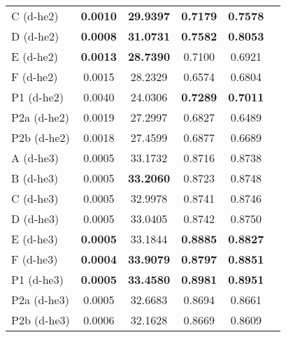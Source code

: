 \documentclass[superscriptaddress,longbibliography,aps,prl,twocolumn,10pt]{revtex4-2}
\begin{document}
\begin{table}[t]
{\begin{tabular}{lccccc}
C (d-he2) \cite{Khan2014, stain_normalisation_toolbox_v2_2, Ruifrok2001} & \textbf{0.0010} & \textbf{29.9397} & \textbf{0.7179} & \textbf{0.7578} \\
D (d-he2) \cite{Khan2014, stain_normalisation_toolbox_v2_2, Macenko2009} & \textbf{0.0008} & \textbf{31.0731} & \textbf{0.7582} & \textbf{0.8053} \\
E (d-he2) \cite{Khan2014, stain_normalisation_toolbox_v2_2} & \textbf{0.0013} & \textbf{28.7390} & 0.7100 & 0.6921 \\
F (d-he2) \cite{Alsubaie2017} & 0.0015 & 28.2329 & 0.6574 & 0.6804 \\
P1 (d-he2) & 0.0040 & 24.0306 & \textbf{0.7289} & \textbf{0.7011} \\
P2a (d-he2) & 0.0019 & 27.2997 & 0.6827 & 0.6489 \\
P2b (d-he2) & 0.0018 & 27.4599 & 0.6877 & 0.6689 \\
\hline
A (d-he3) \cite{Ruifrok2001} & 0.0005 & 33.1732 & 0.8716 & 0.8738 \\
B (d-he3) \cite{Ruifrok2001} & 0.0005 & \textbf{33.2060} & 0.8723 & 0.8748 \\
C (d-he3) \cite{Khan2014, stain_normalisation_toolbox_v2_2, Ruifrok2001} & 0.0005 & 32.9978 & 0.8741 & 0.8746 \\
D (d-he3) \cite{Khan2014, stain_normalisation_toolbox_v2_2, Macenko2009} & 0.0005 & 33.0405 & 0.8742 & 0.8750 \\
E (d-he3) \cite{Khan2014, stain_normalisation_toolbox_v2_2} & \textbf{0.0005} & 33.1844 & \textbf{0.8885} & \textbf{0.8827} \\
F (d-he3) \cite{Alsubaie2017} & \textbf{0.0004} & \textbf{33.9079} & \textbf{0.8797} & \textbf{0.8851} \\
P1 (d-he3) & \textbf{0.0005} & \textbf{33.4580} & \textbf{0.8981} & \textbf{0.8951} \\
P2a (d-he3) & 0.0005 & 32.6683 & 0.8694 & 0.8661 \\
P2b (d-he3) & 0.0006 & 32.1628 & 0.8669 & 0.8609 \\
\bottomrule
\end{tabular}}
\label{tab:Estain_sep_comp}
\end{table}
\end{document}
